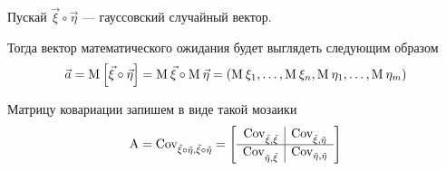 Пускай $\vec{\xi} \circ \vec{\eta}$ --- гауссовский случайный вектор.

Тогда вектор математического ожидания будет выглядеть следующим образом
$$\vec{a}
  = \operatorname{M}_{} \left[ \vec{\xi} \circ \vec{\eta} \right]
  = \operatorname{M}_{} \vec{\xi} \circ \operatorname{M}_{} \vec{\eta}
  = \left( \operatorname{M}_{} \xi_1, \dots, \operatorname{M}_{} \xi_n,
      \operatorname{M}_{} \eta_1, \dots, \operatorname{M}_{} \eta_m \right)$$

Матрицу ковариации запишем в виде такой мозаики
\begin{equation}\label{eq:covMatrix:mozaik}
  \operatorname{A}
  = \operatorname{Cov^{}_{\vec{\xi} \circ \vec{\eta}, \vec{\xi} \circ \vec{\eta}}}
  = \left[ \begin{array}{r|l}
      \operatorname{Cov^{}_{\vec{\xi}, \vec{\xi}}} & \operatorname{Cov^{}_{\vec{\xi}, \vec{\eta}}} \\
      \hline
      \operatorname{Cov^{}_{\vec{\eta}, \vec{\xi}}} & \operatorname{Cov^{}_{\vec{\eta}, \vec{\eta}}} \\
      \end{array} \right]
\end{equation}

